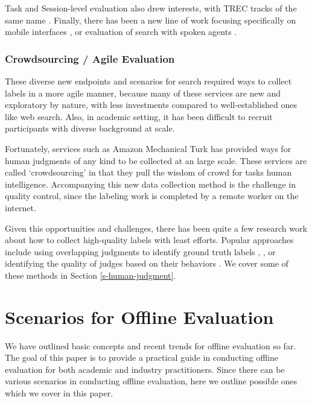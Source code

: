 Task and Session-level evaluation \cite{KanoulasCCS11, CarteretteKHC14} also drew interests, with TREC tracks of the same name \cite{carterette2014overview}. Finally, there has been a new line of work focusing specifically on mobile interfaces \cite{VermaYC16}, or evaluation of search with spoken agents \cite{Kiseleva:2016}.

\subsubsection{Crowdsourcing / Agile Evaluation}

These diverse new endpoints and scenarios for search required ways to collect labels in a more agile manner, because many of these services are new and exploratory by nature, with less investments compared to well-established ones like web search. Also, in academic setting, it has been difficult to recruit participants with diverse background at scale.

Fortunately, services such as Amazon Mechanical Turk has provided ways for human judgments of any kind to be collected at an large scale. These services are called `crowdsourcing' in that they pull the wisdom of crowd for tasks human intelligence. Accompanying this new data collection method is the challenge in quality control, since the labeling work is completed by a remote worker on the internet.

Given this opportunities and challenges, there has been quite a few research work \cite{Alonso2012} about how to collect high-quality labels with least efforts. Popular approaches include using overlapping judgments to identify ground truth labels \cite{Venanzi:2014}, , or identifying the quality of judges based on their behaviors \cite{Kazai:2016}. We cover some of these methods in Section \ref{s-human-judgment}.


\section{Scenarios for Offline Evaluation}

We have outlined basic concepts and recent trends for offline evaluation so far. The goal of this paper is to provide a practical guide in conducting offline evaluation for both academic and industry practitioners. Since there can be various scenarios in conducting offline evaluation, here we outline possible ones which we cover in this paper.

